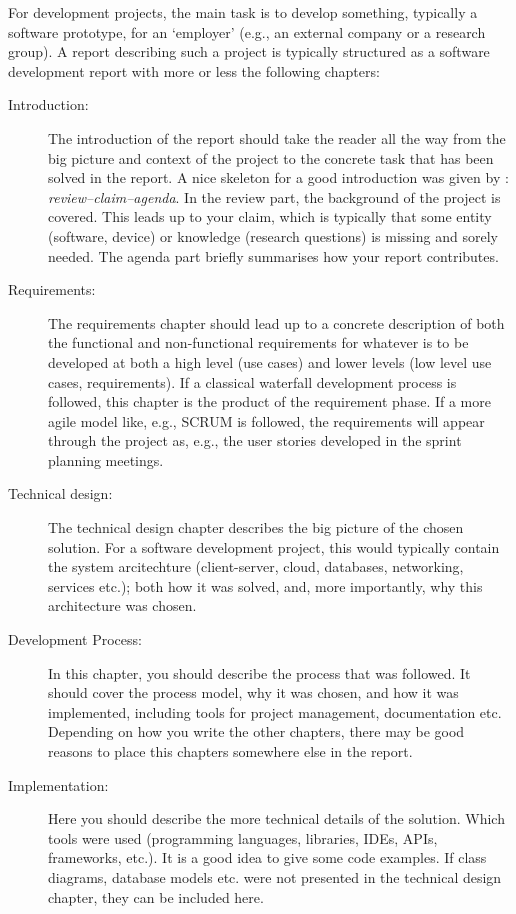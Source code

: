For development projects, the main task is to develop something, typically a software prototype, for an `employer' (e.g., an external company or a research group). A report describing such a project is typically structured as a software development report with more or less the following chapters:

\begin{description}
    \item[Introduction:] The introduction of the report should take the reader all the way from the big picture and context of the project to the concrete task that has been solved in the report. A nice skeleton for a good introduction was given by \textcite{claerbout1991scrutiny}: \emph{review–claim–agenda}. In the review part, the background of the project is covered. This leads up to your claim, which is typically that some entity (software, device) or knowledge (research questions) is missing and sorely needed. The agenda part briefly summarises how your report contributes.
    \item[Requirements:] The requirements chapter should lead up to a concrete description of both the functional and non-functional requirements for whatever is to be developed at both a high level (use cases) and lower levels (low level use cases, requirements). If a classical waterfall development process is followed, this chapter is the product of the requirement phase. If a more agile model like, e.g., SCRUM is followed, the requirements will appear through the project as, e.g., the user stories developed in the sprint planning meetings.
    \item[Technical design:] The technical design chapter describes the big picture of the chosen solution. For a software development project, this would typically contain the system arcitechture (client-server, cloud, databases, networking, services etc.); both how it was solved, and, more importantly, why this architecture was chosen.
    \item[Development Process:] In this chapter, you should describe the process that was followed. It should cover the process model, why it was chosen, and how it was implemented, including tools for project management, documentation etc. Depending on how you write the other chapters, there may be good reasons to place this chapters somewhere else in the report.
    \item[Implementation:] Here you should describe the more technical details of the solution. Which tools were used (programming languages, libraries, IDEs, APIs, frameworks, etc.). It is a good idea to give some code examples. If class diagrams, database models etc. were not presented in the technical design chapter, they can be included here.

\end{description}

